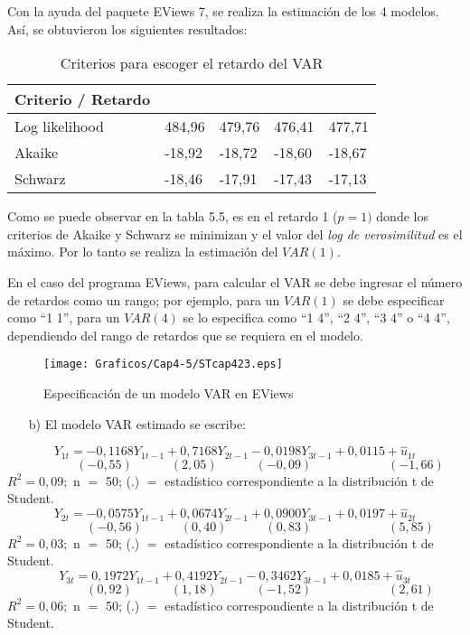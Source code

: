 Con la ayuda del paquete EViews 7, se realiza la estimaci\'{o}n de los 4 modelos. As\'{i}, se obtuvieron los siguientes resultados:

\begin{table}[H]
\centering
\begin{tabular}{|l|p{30pt}|p{30pt}|p{30pt}|p{30pt}|}\hline
Criterio / Retardo &\quad 1 &\quad 2 &\quad 3 &\quad 4 \\ \hline
Log likelihood & 484,96 & 479,76 & 476,41 & 477,71 \\ \hline
Akaike & -18,92 & -18,72 & -18,60 & -18,67 \\ \hline
Schwarz & -18,46 & -17,91 & -17,43 & -17,13 \\ \hline
\end{tabular}
\caption{Criterios para escoger el retardo del VAR}
\label{tab17}
\end{table}

Como se puede observar en la tabla 5.5, es en el retardo 1 ($p=1)$ donde los criterios de Akaike y Schwarz se minimizan y el valor del \textit{log de verosimilitud} es el m\'{a}ximo. Por lo tanto se realiza la estimaci\'{o}n del $VAR(1)$.\newline

En el caso del programa EViews, para calcular el VAR se debe ingresar el n\'{u}mero de retardos como un rango; por ejemplo, para un $VAR(1)$ se debe especificar como ``1 1'', para un $VAR(4)$ se lo especifica como ``1 4'', ``2 4'', ``3 4'' o ``4 4'', dependiendo del rango de retardos que se requiera en el modelo.

\begin{figure}[H]
\centering
\texttt{[image: Graficos/Cap4-5/STcap423.eps]}
\caption{Especificaci\'{o}n de un modelo VAR en EViews}
\label{fig23}
\end{figure}

\begin{enumerate}
      \item[b)] El modelo VAR estimado se escribe: 
\end{enumerate}
\[
Y_{1t}=-0,1168Y_{1t-1}+0,7168Y_{2t-1}-0,0198Y_{3t-1}+0,0115+\hat{u}_{1t}
\]
\[
\qquad\qquad(-0,55)\quad\qquad (2,05)\quad\qquad (-0,09)\qquad\qquad\qquad (-1,66)
\]
$R^{2}= 0,09;$ n $=$ 50; (.) $=$ estad\'{i}stico correspondiente a la distribuci\'{o}n t de Student.
\[
Y_{2t}=-0,0575Y_{1t-1}+0,0674Y_{2t-1}+0,0900Y_{3t-1}+0,0197+\hat{u}_{2t}
\]
\[
\qquad\qquad(-0,56)\quad\qquad (0,40)\quad\qquad (0,83)\qquad\qquad\qquad (5,85)
\]
$R^{2}= 0,03;$ n $=$ 50; (.) $=$ estad\'{i}stico correspondiente a la distribuci\'{o}n t de Student.
\[
Y_{3t}=0,1972Y_{1t-1}+0,4192Y_{2t-1}-0,3462Y_{3t-1}+0,0185+\hat{u}_{3t}
\]
\[
\qquad\qquad(0,92)\quad\qquad (1,18)\quad\qquad (-1,52)\qquad\qquad\qquad (2,61)
\]
$R^{2}= 0,06;$ n $=$ 50; (.) $=$ estad\'{i}stico correspondiente a la distribuci\'{o}n t de Student.\newline

